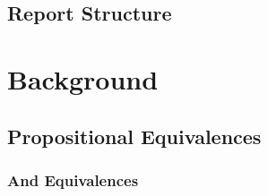 \documentclass[12pt]{article}
\begin{document}
\subsection{Report Structure}

\newpage




\section{Background}



\subsection{Propositional Equivalences}



\subsubsection{And Equivalences}
\end{document}
